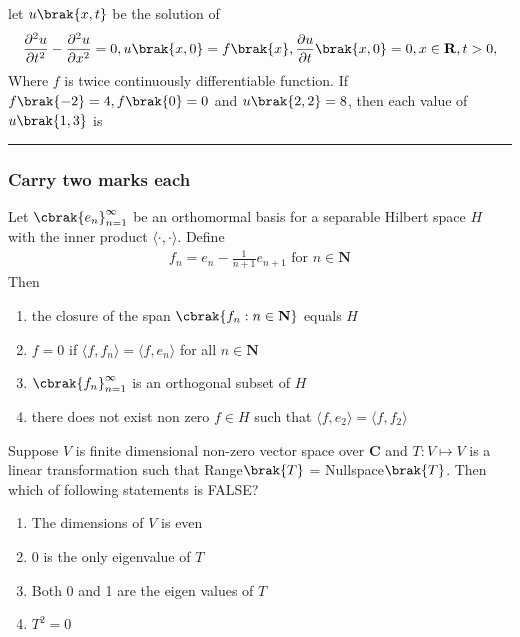 		\hfill{}

		\item 
		let $u\brak{x,t}$ be the solution of
		\begin{align*}
		\frac{\partial^2 u}{\partial t^2} - \frac{\partial^2 u}{\partial x^2} = 0, u\brak{x,0} = f\brak{x}, \frac{\partial u}{\partial t}\brak{x,0} = 0, x\in \mathbf{R}, t > 0,
		\end{align*}
		Where $f$ is twice continuously differentiable function. If $f\brak{-2} = 4, f\brak{0} = 0$ and $u\brak{2,2} = 8$, then each value of $u\brak{1,3}$ is \rule{2cm}{0.1pt}
		
		\hfill{}

\subsubsection{Carry two marks each}
		\item 
		Let $\cbrak{e_n}_{n = 1}^{\infty}$ be an orthomormal basis for a separable Hilbert space $H$ with the inner product $\langle \cdot, \cdot \rangle$. Define 
		\begin{align*}
			f_n = e_n - \frac{1}{n + 1}e_{n + 1} \text{ for } n \in \mathbf{N}
		\end{align*}
		Then 
		
		\hfill{}
		
		\begin{enumerate}
			\item the closure of the span $\cbrak{f_n : n \in \mathbf{N}}$ equals $H$
			\item $f = 0$ if $\langle{f}, f_n \rangle = \langle f, e_n \rangle$ for all $ n \in \mathbf{N}$
			\item $\cbrak{f_n}_{n = 1}^{\infty}$ is an orthogonal subset of $H$
			\item there does not exist non zero $f \in H$ such that $\langle f , e_2\rangle = \langle{f}, f_2\rangle$
		\end{enumerate}

		\item
			Suppose $V$ is finite dimensional non-zero vector space over $\mathbf{C}$ and $T: V \mapsto V$ is a linear transformation such that Range$\brak{T}$ = Nullspace$\brak{T}$. Then which of following statements is FALSE?
			
			\hfill{}
		
		\begin{enumerate}
			\item The dimensions of $V$ is even 
			\item 0 is the only eigenvalue of $T$
			\item Both 0 and 1 are the eigen values of $T$
			\item $T^2 = 0$
		\end{enumerate}

